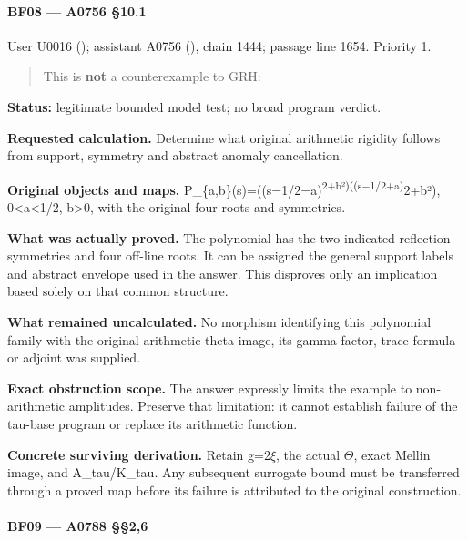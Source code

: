\paragraph{BF08 --- A0756 §10.1}\label{bf08-a0756-10.1}

User U0016 (\protect{});
assistant A0756 (\protect{}),
chain 1444; passage line 1654. Priority 1.

\begin{quote}
This is \textbf{not} a counterexample to GRH:
\end{quote}

\textbf{Status:} legitimate bounded model test; no broad program
verdict.

\textbf{Requested calculation.} Determine what original arithmetic
rigidity follows from support, symmetry and abstract anomaly
cancellation.

\textbf{Original objects and maps.}
P\_\{a,b\}(s)=((s\allowbreak{}\ensuremath{−}\allowbreak{}1/2\allowbreak{}\ensuremath{−}\allowbreak{}a)\textsuperscript{2+b²)((s\allowbreak{}\ensuremath{−}\allowbreak{}1/2+a)}2+b²),
0\textless a\textless1/2, b\textgreater0, with the original four roots
and symmetries.

\textbf{What was actually proved.} The polynomial has the two indicated
reflection symmetries and four off-line roots. It can be assigned the
general support labels and abstract envelope used in the answer. This
disproves only an implication based solely on that common structure.

\textbf{What remained uncalculated.} No morphism identifying this
polynomial family with the original arithmetic theta image, its gamma
factor, trace formula or adjoint was supplied.

\textbf{Exact obstruction scope.} The answer expressly limits the
example to non-arithmetic amplitudes. Preserve that limitation: it
cannot establish failure of the tau-base program or replace its
arithmetic function.

\textbf{Concrete surviving derivation.} Retain
g=2\allowbreak{}\ensuremath{ξ}\allowbreak{}, the actual
\allowbreak{}\ensuremath{Θ}\allowbreak{}, exact Mellin image, and
A\_tau/K\_tau. Any subsequent surrogate bound must be transferred
through a proved map before its failure is attributed to the original
construction.

\paragraph{BF09 --- A0788 §§2,6}\label{bf09-a0788-26}


